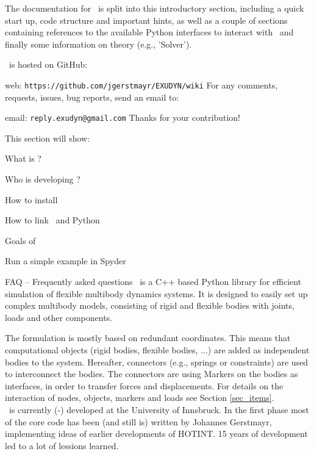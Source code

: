 
The documentation for \codeName\ is split into this introductory section, including a quick start up, code structure and important hints, 
as well as a couple of sections containing references to the available Python interfaces to interact with \codeName\ and finally some information on theory (e.g., 'Solver').

\codeName\ is hosted on GitHub:
\bi
 \item web: \texttt{https://github.com/jgerstmayr/EXUDYN/wiki}
\ei
For any comments, requests, issues, bug reports, send an email to: 
\bi
  \item email: \texttt{reply.exudyn@gmail.com}
\ei
Thanks for your contribution!

This section will show:
\bn
	\item What is \codeName ?
	\item Who is developing \codeName ?
	\item How to install \codeName\ 
	\item How to link \codeName\ and Python
	\item Goals of \codeName
	\item Run a simple example in Spyder
	\item FAQ -- Frequently asked questions
\en
%
\codeName\ is a C++ based Python library for efficient simulation of flexible multibody dynamics systems.
It is designed to easily set up complex multibody models, consisting of rigid and flexible bodies with joints, loads and other components.

The formulation is mostly based on redundant coordinates. This means that computational objects (rigid bodies, flexible bodies, ...) are added as independent bodies to the system. Hereafter, connectors (e.g., springs or constraints) are used to interconnect the bodies. The connectors are using Markers on the bodies as interfaces, in order to transfer forces and displacements.
For details on the interaction of nodes, objects, markers and loads see Section \ref{sec_items}.
\vspace{6pt}\\
%
\codeName\ is currently (\the\month-\the\year) developed at the University of Innsbruck.
In the first phase most of the core code has been (and still is) written by Johannes Gerstmayr, implementing ideas of earlier developments of HOTINT. 15 years of development led to a lot of lessions learned.

